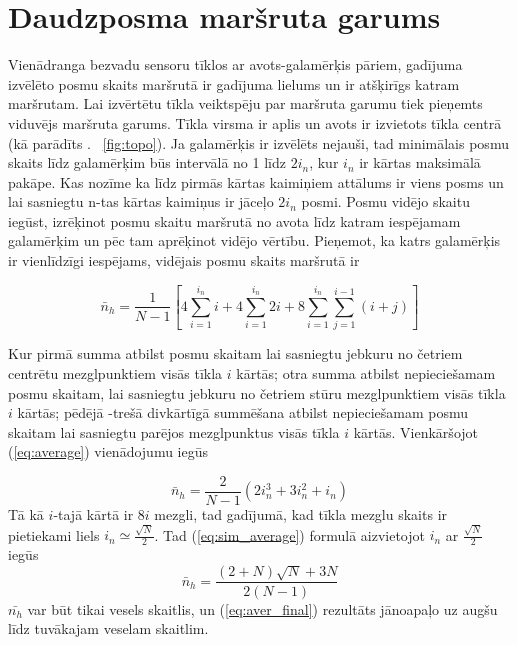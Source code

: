 \section{Daudzposma maršruta garums}\label{sec:route}
Vienādranga bezvadu sensoru tīklos ar avots-galamērķis pāriem, gadījuma izvēlēto posmu skaits maršrutā ir gadījuma lielums un ir atšķirīgs katram maršrutam. Lai izvērtētu tīkla  veiktspēju  par maršruta garumu tiek pieņemts viduvējs maršruta garums. Tīkla virsma ir aplis un avots ir izvietots tīkla centrā (kā parādīts \figurename. ~\ref{fig:topo}). Ja galamērķis ir izvēlēts nejauši, tad minimālais posmu skaits līdz galamērķim būs intervālā no 1 līdz $2i_{n}$, kur $i_{n}$ ir  kārtas maksimālā pakāpe. Kas nozīme ka līdz pirmās kārtas kaimiņiem attālums ir viens posms un lai sasniegtu n-tas kārtas kaimiņus ir jāceļo $2i_{n}$ posmi. Posmu vidējo skaitu iegūst, izrēķinot posmu skaitu maršrutā no avota līdz katram iespējamam galamērķim un pēc tam aprēķinot vidējo vērtību. Pieņemot, ka katrs galamērķis ir vienlīdzīgi iespējams, vidējais posmu skaits maršrutā ir

\begin{equation}
\bar{n}_{h}=\frac{1}{N-1}\left[4 \sum^{i_{n}}_{i=1}i+4\sum^{i_{n}}_{i=1}2i+8\sum^{i_{n}}_{i=1}\sum^{i-1}_{j=1}(i+j)\right]
\label{eq:average}
\end{equation}

Kur pirmā summa atbilst posmu skaitam lai sasniegtu jebkuru no četriem centrētu mezglpunktiem visās tīkla $i$ kārtās; otra summa atbilst nepieciešamam posmu skaitam, lai sasniegtu jebkuru no četriem stūru mezglpunktiem visās tīkla $i$ kārtās; pēdējā -trešā divkārtīgā summēšana atbilst nepieciešamam posmu skaitam lai sasniegtu parējos mezglpunktus visās tīkla $i$ kārtās. Vienkāršojot (\ref{eq:average}) vienādojumu iegūs

\begin{equation}
\bar{n}_{h}=\frac{2}{N-1}\left (2i^3_{n}+3i^2_{n}+i_{n}\right )
\label{eq:sim_average}
\end{equation}
Tā kā $i$-tajā kārtā ir $8i$ mezgli, tad gadījumā, kad tīkla mezglu skaits ir pietiekami liels $i_{n}\simeq\frac{\sqrt{N}}{2}$. Tad (\ref{eq:sim_average}) formulā aizvietojot $i_{n}$ ar $\frac{\sqrt{N}}{2}$ iegūs\\
\begin{equation}
\bar{n}_{h}=\frac{(2+N)\sqrt{N}+3N}{2(N-1)}
\label{eq:aver_final}
\end{equation}
$\bar{n_{h}}$ var būt tikai vesels skaitlis, un (\ref{eq:aver_final}) rezultāts jānoapaļo uz augšu līdz tuvākajam veselam skaitlim.

